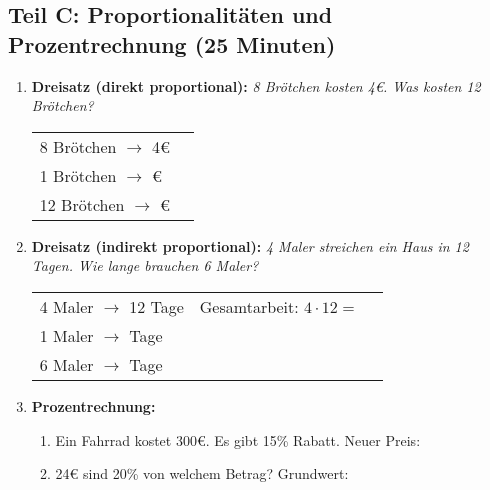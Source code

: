 \subsection*{Teil C: Proportionalitäten und Prozentrechnung (25 Minuten)}

\begin{enumerate}[label=\arabic*.]

    \item \textbf{Dreisatz (direkt proportional):}
    \textit{8 Brötchen kosten 4€. Was kosten 12 Brötchen?}
    \vspace{0.5cm}

    \begin{tabular}{ll}
        8 Brötchen $\rightarrow$ 4€ & \\
        1 Brötchen $\rightarrow$ \underline{\hspace{1cm}}€ & \\
        12 Brötchen $\rightarrow$ \underline{\hspace{1cm}}€ &
    \end{tabular}

    \vspace{1cm}

    \item \textbf{Dreisatz (indirekt proportional):}
    \textit{4 Maler streichen ein Haus in 12 Tagen. Wie lange brauchen 6 Maler?}
    \vspace{0.5cm}

    \begin{tabular}{ll}
        4 Maler $\rightarrow$ 12 Tage & Gesamtarbeit: $4 \cdot 12 = \phantom{00}$ \\
        1 Maler $\rightarrow$ \underline{\hspace{1cm}} Tage & \\
        6 Maler $\rightarrow$ \underline{\hspace{1cm}} Tage &
    \end{tabular}

    \vspace{1cm}

    \item \textbf{Prozentrechnung:}
    \vspace{0.5cm}

    \begin{enumerate}[label=\alph*)]
        \item Ein Fahrrad kostet 300€. Es gibt 15\% Rabatt. Neuer Preis: \underline{\hspace{3cm}}
        \vspace{0.3cm}

        \item 24€ sind 20\% von welchem Betrag? Grundwert: \underline{\hspace{3cm}}
    \end{enumerate}

\end{enumerate}